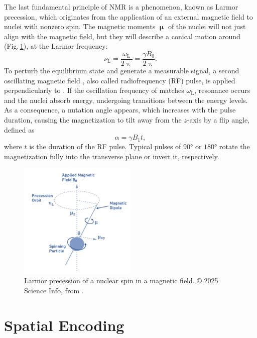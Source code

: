 The last fundamental principle of NMR is a phenomenon, known as Larmor precession, which originates from the application of an external magnetic field to nuclei with nonzero spin. The magnetic moments $\bm{\upmu}$ of the nuclei will not just align with the magnetic field, but they will describe a conical motion around  (Fig.\,\ref{fig:larmor_precession}), at the Larmor frequency:
\begin{equation}
    \nu_\textrm{L} = \frac{\omega_\textrm{L}}{2\uppi} = \frac{\gamma B_0}{2\uppi}.
\end{equation}
To perturb the equilibrium state and generate a measurable signal, a second oscillating magnetic field , also called radiofrequency (RF) pulse, is applied perpendicularly to . If the oscillation frequency of  matches $\omega_\mathrm{L}$, resonance occurs and the nuclei absorb energy, undergoing transitions between the energy levels. As a consequence, a nutation angle appears, which increases with the pulse duration, causing the magnetization  to tilt away from the $z$-axis by a flip angle, defined as
\begin{equation}
    \alpha = \gamma B_1 t,
\end{equation}
where $t$ is the duration of the RF pulse. Typical pulses of $90$° or $180$° rotate the magnetization fully into the transverse plane or invert it, respectively.

\begin{figure}[htbp]
    \centering
    \includegraphics[width=0.5\textwidth]{figures/larmor_precession.jpeg}
    \caption{Larmor precession of a nuclear spin in a magnetic field. © 2025 Science Info, from \cite{science_info}.}
    \label{fig:larmor_precession}
\end{figure}

\section{Spatial Encoding}
